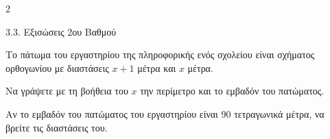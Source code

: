 \begin{ylh}{2}
    \item 3.3. Εξισώσεις 2ου Βαθμού
\end{ylh}
Το πάτωμα του εργαστηρίου της πληροφορικής ενός σχολείου είναι σχήματος ορθογωνίου με διαστάσεις $x + 1$ μέτρα και $x$ μέτρα.

\begin{alist}
\item Να γράψετε με τη βοήθεια του $x$ την περίμετρο και το εμβαδόν του πατώματος.
\item Αν το εμβαδόν του πατώματος του εργαστηρίου είναι 90 τετραγωνικά μέτρα, να βρείτε τις διαστάσεις του.

\end{alist}


